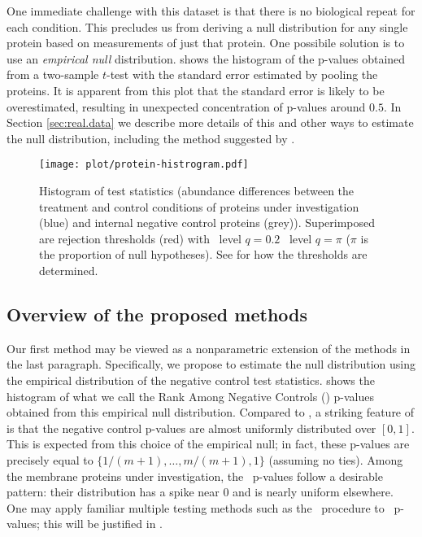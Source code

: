 \documentclass[a4paper,11pt]{article}
\theoremstyle{plain}
\theoremstyle{definition}
\theoremstyle{plain}
\newcommand{\No}{{n}}
\newcommand{\NoNc}{m}
\newcommand{\nickname}{{\text{RANC}}}
\newcommand{\FDR}{\text{FDR}}
\newcommand{\localFDR}{\text{local-FDR}}
\newcommand{\BH}{{\text{BH}}}
\begin{document}
One immediate challenge with this dataset is that there is no
biological repeat for each condition. This precludes us from deriving
a null distribution for any single protein based on measurements of
just that protein. One possibile solution is to use an \emph{empirical
  null} distribution.  shows the
histogram of the p-values obtained from a two-sample $t$-test with the
standard error estimated by pooling the
proteins. It is apparent from this plot that the standard error is likely to be overestimated, resulting in unexpected concentration of
p-values around $0.5$. In Section \ref{sec:real.data} we describe more
details of this and other ways to estimate the null distribution,
including the method suggested by \textcite{efron2004large}.

\begin{figure}[tbp]
  \centering
    \texttt{[image: plot/protein-histrogram.pdf]}

  \caption{Histogram of test statistics (abundance differences between the
      treatment and control conditions of proteins
      under investigation (blue) and internal negative control
      proteins (grey)). Superimposed are rejection thresholds
      (red) with \FDR~level $q = 0.2$ \localFDR~level $q = \pi$ ($\pi$
      is the proportion of null hypotheses). See  for
    how the thresholds are determined.}
    \label{fig:protein}
\end{figure}


\subsection{Overview of the proposed methods}\label{sec:overview}

Our first method may be viewed as a nonparametric extension of the
methods in the last paragraph. Specifically, we propose to
estimate the null distribution using the empirical distribution of the
negative control test statistics.  shows the
histogram of what we call the Rank Among Negative Controls (\nickname)
p-values obtained from this empirical null distribution. Compared to
, a striking feature of
 is that the negative control p-values are
almost uniformly distributed over $[0,1]$. This is expected from this
choice of the empirical null; in fact, these p-values are precisely
equal to $\{1/(\NoNc+1), \dotsc, \NoNc/(\NoNc+1), 1\}$ (assuming no
ties). Among the membrane proteins under investigation, the \nickname\
p-values follow a desirable pattern: their distribution has a spike
near $0$ and is nearly uniform elsewhere. One may apply familiar
multiple testing methods such as the \BH\ procedure to \nickname\
p-values; this will be justified in .
\end{document}
